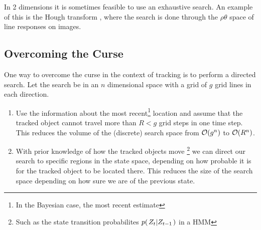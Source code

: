 \begin{example}
  In 2 dimensions it is sometimes feasible to use an exhaustive search.
  An example of this is the Hough transform \cite{DigitalImageProcessing}, 
  where the search is done through the $\rho\theta$ space of line responses on images.
\end{example}

\subsection{Overcoming the Curse}
One way to overcome the curse in the context of tracking is to perform a directed search. Let the search be in an $n$ dimensional space with a grid of $g$ grid lines in each direction.

\begin{enumerate}
    \item Use the information about the most recent\footnote{In the Bayesian case, the most recent estimate} 
    location and assume that the tracked object cannot travel more than $R < g$ grid steps in one time step. 
    This reduces the volume of the (discrete) search space from $\mathcal{O}{\left(g^n\right)}$ to $\mathcal{O}{\left(R^n\right)}$.
    \item With prior knowledge of how the tracked objects move
    \footnote{Such as the state transition probabilites $p{(\left. Z_t \middle\vert Z_{t-1} \right.)}$ in a HMM} 
    we can direct our search to specific regions in the state space, 
    depending on how probable it is for the tracked object to be located there. This reduces the size of the
    search space depending on how sure we are of the previous state.
\end{enumerate} 


